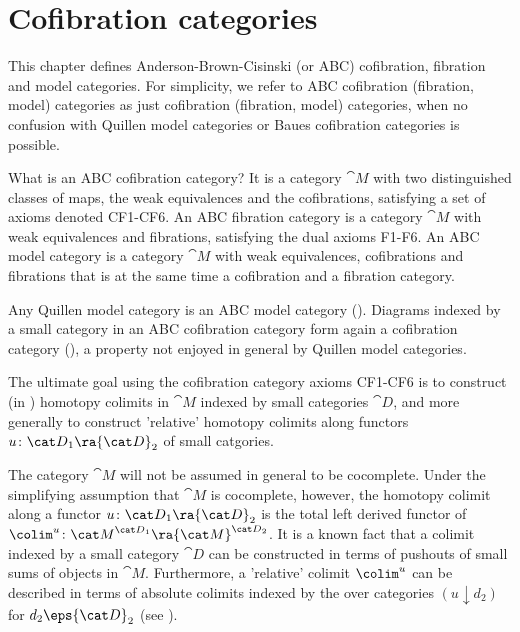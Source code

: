 \chapter{Cofibration categories}
\label{chap:CofibrationAndFibrationCategories}

This chapter defines Anderson-Brown-Cisinski (or ABC) cofibration, fibration and model categories. For simplicity, we refer to ABC cofibration (fibration, model) categories as just cofibration (fibration, model) categories, when no confusion with Quillen model categories or Baues cofibration categories is possible.

What is an ABC cofibration category? It is a category ${\cat M}$ with two distinguished classes of maps, the weak equivalences and the cofibrations, satisfying a set of axioms denoted CF1-CF6. An ABC fibration category is a category ${\cat M}$ with weak equivalences and fibrations, satisfying the dual axioms F1-F6. An ABC model category is a category ${\cat M}$ with weak equivalences, cofibrations and fibrations that is at the same time a cofibration and a fibration category.

Any Quillen model category is an ABC model category (). Diagrams indexed by a small category in an ABC cofibration category form again a cofibration category (), a property not enjoyed in general by Quillen model categories.

The ultimate goal using the cofibration category axioms CF1-CF6 is to construct (in ) homotopy colimits in ${\cat M}$ indexed by small categories ${\cat D}$, and more generally to construct 'relative' homotopy colimits along functors $u \colon {\cat D}_1 \ra {\cat D}_2$ of small catgories.

The category ${\cat M}$ will not be assumed in general to be cocomplete. Under the simplifying assumption that ${\cat M}$ is cocomplete, however, the homotopy colimit along a functor $u \colon {\cat D}_1 \ra {\cat D}_2$ is the total left derived functor of $\colim^u \colon {\cat M}^{{\cat D}_1} \ra {\cat M}^{{\cat D}_2}$. It is a known fact that a colimit indexed by a small category ${\cat D}$ can be constructed in terms of pushouts of small sums of objects in ${\cat M}$. Furthermore, a 'relative' colimit $\colim^u$ can be described in terms of absolute colimits indexed by the over categories $(u \downarrow d_2)$ for $d_2 \eps {\cat D}_2$ (see ).

